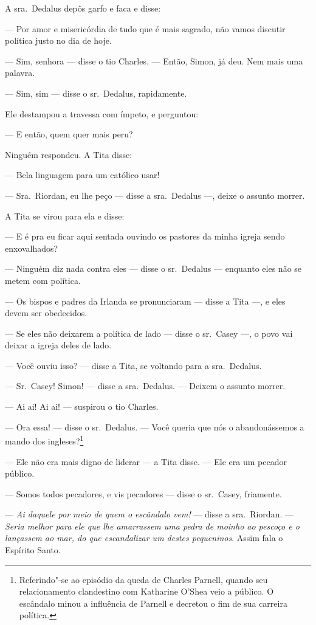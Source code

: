 A sra.~Dedalus depôs garfo e faca e disse:

 --- Por amor e misericórdia de tudo que é mais sagrado, não vamos discutir política justo no dia de hoje.

 --- Sim, senhora --- disse o tio Charles. --- Então, Simon, já deu. Nem mais uma palavra.

 --- Sim, sim --- disse o sr.~Dedalus, rapidamente.

Ele destampou a travessa com ímpeto, e perguntou:

 --- E então, quem quer mais peru?

Ninguém respondeu. A Tita disse:

 --- Bela linguagem para um católico usar!

 --- Sra.~Riordan, eu lhe peço --- disse a sra.~Dedalus ---, deixe o assunto morrer.

A Tita se virou para ela e disse:

 --- E é pra eu ficar aqui sentada ouvindo os pastores da minha igreja
sendo enxovalhados?

 --- Ninguém diz nada contra eles --- disse o sr.~Dedalus --- enquanto eles não se metem com política.

 --- Os bispos e padres da Irlanda se pronunciaram --- disse a Tita ---, e eles devem ser obedecidos.

 --- Se eles não deixarem a política de lado --- disse o sr.~Casey ---, o povo vai deixar a igreja deles de lado.

 --- Você ouviu isso? --- disse a Tita, se voltando para a sra.~Dedalus.

 --- Sr.~Casey! Simon! --- disse a sra.~Dedalus. --- Deixem o assunto morrer.

 --- Ai ai! Ai ai! --- suspirou o tio Charles.

 --- Ora essa! --- disse o sr.~Dedalus. --- Você queria que nós o abandonássemos a mando dos ingleses?\footnote{ Referindo"-se ao episódio da queda de Charles
Parnell, quando seu relacionamento clandestino com Katharine O’Shea veio a público.
O escândalo minou a influência de Parnell e decretou o fim de sua
carreira política.}

 --- Ele não era mais digno de liderar --- a Tita disse. --- Ele era um pecador público.

 --- Somos todos pecadores, e vis pecadores --- disse o sr.~Casey, friamente.

 --- \textit{Ai daquele por meio de quem o escândalo vem!} --- disse a sra.~Riordan. --- \textit{ Seria melhor para ele que lhe amarrassem uma pedra de moinho ao pescoço e o lançassem ao mar, do que escandalizar um destes pequeninos}. Assim fala o Espírito Santo.

